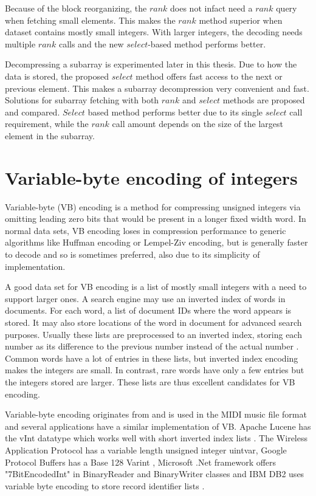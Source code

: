 Because of the block reorganizing, the $rank$ does not infact need a $rank$ query when fetching small elements. This makes the $rank$ method superior when dataset contains 
mostly small integers. With larger integers, the decoding needs multiple $rank$ calls and the new $select$-based method performs better. 

Decompressing a subarray is experimented later in this thesis. Due to how the data is stored, the proposed $select$ method offers fast access to the next or previous element. This makes a 
subarray decompression very convenient and fast. Solutions for subarray fetching with both $rank$ and $select$ methods are proposed and compared. $Select$ based method performs better due to its 
single $select$ call requirement, while the $rank$ call amount depends on the size of the largest element in the subarray.

\chapter{Variable-byte encoding of integers}

Variable-byte (VB) encoding \citep{Wil99} is a method for compressing unsigned integers via omitting leading zero bits that would be present in a longer fixed 
width word. In normal data sets, VB encoding loses in compression performance to generic algorithms like Huffman encoding or Lempel-Ziv encoding, but 
is generally faster to decode \citep{Bri09} and so is sometimes preferred, also  due to its simplicity of implementation.

A good data set for VB encoding is a list of mostly small integers with a need to support larger ones. A search engine may use an inverted index of 
words in documents. For each word, a list of document IDs where the word appears is stored. It may also store locations of the word in document for 
advanced search purposes. Usually these lists are preprocessed to an inverted index, storing each number as its difference to the previous number 
instead of the actual number \citep{Man08}. Common words have a lot of entries in these lists, but inverted index encoding makes the integers are small. 
In contrast, rare words have only a few entries but the integers stored are larger. These lists are thus excellent candidates for VB encoding. 

Variable-byte encoding originates from and is used in the MIDI music file format \citep{Mid96} and several applications have a similar implementation of VB. Apache 
Lucene has the vInt datatype \citep{ApaLV} which works well with short inverted index lists \citep{Wan09}. The Wireless Application Protocol has a variable length unsigned integer uintvar, Google Protocol Buffers has a Base 128 Varint \citep{GooPB},
 Microsoft .Net framework offers "7BitEncodedInt" in BinaryReader and BinaryWriter classes and IBM DB2 uses variable byte encoding to store record identifier lists \citep{Bha09}.

